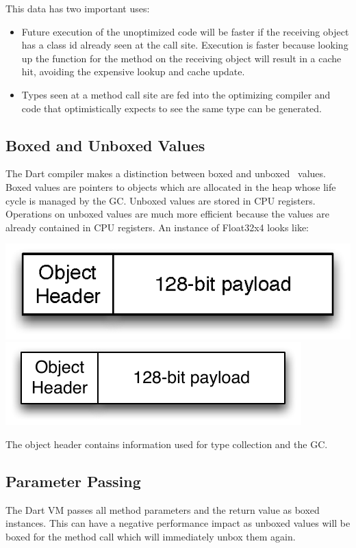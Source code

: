 \documentclass[preprint]{sigplanconf}
\begin{document}
This data has two important uses:
\begin{itemize}
\item Future execution of the unoptimized code will be faster if the receiving object has a class id already seen at the call site. Execution is faster because looking up the function for the method on the receiving object will result in a cache hit, avoiding the expensive lookup and cache update.
\item Types seen at a method call site are fed into the optimizing compiler and code that optimistically expects to see the same type can be generated.
\end{itemize}

\subsection{Boxed and Unboxed Values}

\label{boxing}
The Dart compiler makes a distinction between boxed and 
unboxed~\cite{unboxing} values. Boxed values are pointers to objects which are allocated in the heap whose life cycle is managed by the GC. Unboxed values are stored in CPU registers. Operations on unboxed values are much more efficient because the values are already contained in CPU registers. An instance of Float32x4 looks like:

\ifx\pdfoutput\undefined
\includegraphics{figures/boxedobject.eps}
\else
\includegraphics{figures/boxedobject-eps-converted-to.pdf}
\fi

The object header contains information used for type collection and the GC.

\subsection{Parameter Passing}
The Dart VM passes all method parameters and the return value as boxed instances. This can have a negative performance impact as unboxed values will be boxed for the method call which will immediately unbox them again.
\end{document}
